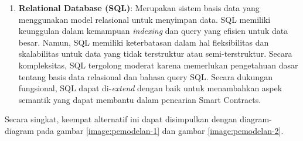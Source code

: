 \begin{enumerate}
	\item \textbf{Relational Database (SQL)}: Merupakan sistem basis data yang menggunakan model relasional untuk menyimpan data. SQL memiliki keunggulan dalam kemampuan \textit{indexing} dan query yang efisien untuk data besar. Namun, SQL memiliki keterbatasan dalam hal fleksibilitas dan skalabilitas untuk data yang tidak terstruktur atau semi-terstruktur. Secara kompleksitas, SQL tergolong moderat karena memerlukan pengetahuan dasar tentang basis data relasional dan bahasa query SQL. Secara dukungan fungsional, SQL dapat di-\textit{extend} dengan baik untuk menambahkan aspek semantik yang dapat membantu dalam pencarian Smart Contracts.
\end{enumerate}

Secara singkat, keempat alternatif ini dapat disimpulkan dengan diagram-diagram pada gambar \ref{image:pemodelan-1} dan gambar \ref{image:pemodelan-2}.